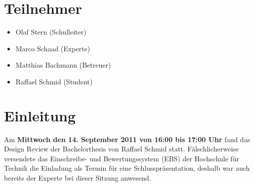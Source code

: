 \section{Teilnehmer}
\begin{itemize}
	\item Olaf Stern (Schulleiter)
	\item Marco Schaad (Experte)
	\item Matthias Bachmann (Betreuer)
	\item Raffael Schmid (Student)
\end{itemize}
\section{Einleitung}
Am \textbf{Mittwoch den 14. September 2011 von 16:00 bis 17:00 Uhr} fand das Design Review der Bachelorthesis von Raffael Schmid statt. Fälschlicherweise versendete das Einschreibe- und Bewertungssystem (EBS) der Hochschule für Technik die Einladung als Termin für eine Schlusspräsentation, deshalb war auch bereits der Experte bei dieser Sitzung anwesend.

